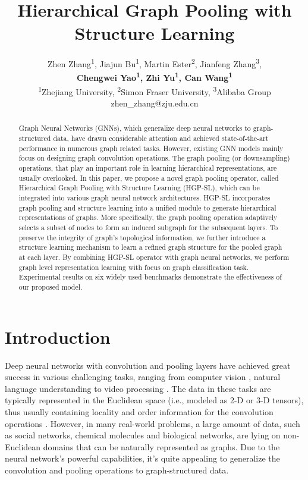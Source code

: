 \documentclass[letterpaper]{article} \usepackage{aaai20}  \usepackage{times}  \usepackage{helvet} \usepackage{courier}  \usepackage[hyphens]{url}  \usepackage{graphicx} \urlstyle{rm} \def\UrlFont{\rm}  \usepackage{graphicx}  \frenchspacing  \setlength{\pdfpagewidth}{8.5in}  \setlength{\pdfpageheight}{11in}
\title{Hierarchical Graph Pooling with Structure Learning}
\author{Zhen Zhang\textsuperscript{\rm 1}, Jiajun Bu\textsuperscript{\rm 1}, Martin Ester\textsuperscript{\rm 2}, Jianfeng Zhang\textsuperscript{\rm 3},\\ \Large \textbf{Chengwei Yao\textsuperscript{\rm 1}, Zhi Yu\textsuperscript{\rm 1}, Can Wang\textsuperscript{\rm 1}}\\\textsuperscript{\rm 1}Zhejiang University, \textsuperscript{\rm 2}Simon Fraser University, \textsuperscript{\rm 3}Alibaba Group\\
zhen\_zhang@zju.edu.cn
}
\begin{document}
\maketitle

\begin{abstract}
Graph Neural Networks (GNNs), which generalize deep neural networks to graph-structured data, have drawn considerable attention and achieved state-of-the-art performance in numerous graph related tasks. However, existing GNN models mainly focus on designing graph convolution operations. The graph pooling (or downsampling) operations, that play an important role in learning hierarchical representations, are usually overlooked. In this paper, we propose a novel graph pooling operator, called Hierarchical Graph Pooling with Structure Learning (HGP-SL), which can be integrated into various graph neural network architectures. HGP-SL incorporates graph pooling and structure learning into a unified module to generate hierarchical representations of graphs. More specifically, the graph pooling operation adaptively selects a subset of nodes to form an induced subgraph for the subsequent layers. To preserve the integrity of graph's topological information, we further introduce a structure learning mechanism to learn a refined graph structure for the pooled graph at each layer. By combining HGP-SL operator with graph neural networks, we perform graph level representation learning with focus on graph classification task. Experimental results on six widely used benchmarks demonstrate the effectiveness of our proposed model.
\end{abstract}

\section{Introduction}
Deep neural networks with convolution and pooling layers have achieved great success in various challenging tasks, ranging from computer vision \cite{he2016deep}, natural language understanding \cite{bahdanau2014neural} to video processing \cite{karpathy2014large}. The data in these tasks are typically represented in the Euclidean space (i.e., modeled as 2-D or 3-D tensors), thus usually containing locality and order information for the convolution operations \cite{defferrard2016convolutional}. However, in many real-world problems, a large amount of data, such as social networks, chemical molecules and biological networks, are lying on non-Euclidean domains that can be naturally represented as graphs. Due to the neural network's powerful capabilities, it's quite appealing to generalize the convolution and pooling operations to graph-structured data.
\end{document}
